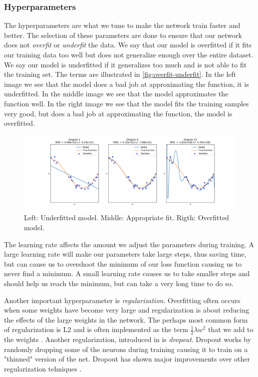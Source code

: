 \subsubsection*{Hyperparameters}
The hyperparameters are what we tune to make the network train faster and better. The selection of these parameters are done to ensure that our network does not \emph{overfit} or \emph{underfit} the data. We say that our model is overfitted if it fits our training data too well but does not generalize enough over the entire dataset. We say our model is underfitted if it generalizes too much and is not able to fit the training set. The terms are illustrated in \autoref{fig:overfit-underfit}. In the left image we see that the model does a bad job at approximating the function, it is underfitted. In the middle image we see that the model approximates the function well. In the right image we see that the model fits the training samples very good, but does a bad job at approximating the function, the model is overfitted.

\begin{figure}[H]
	\centering
	\includegraphics[width=\linewidth]{fig/overfit-underfit.png}
	\caption{Left: Underfitted model. Middle: Appropriate fit. Rigth: Overfitted model. }
	\label{fig:overfit-underfit}
\end{figure}
The learning rate affects the amount we adjust the parameters during training. A large learning rate will make our parameters take large steps, thus saving time, but can cause us to overshoot the minimum of our loss function causing us to never find a minimum. A small learning rate causes us to take smaller steps and should help us reach the minimum, but can take a very long time to do so.

Another important hyperparameter is \emph{regularization}. Overfitting often occurs when some weights have become very large and regularization is about reducing the effects of the large weights in the network. The perhaps most common form of regularization is L2 and is often implemented as the term $\frac{1}{2}\lambda w^2$ that we add to the weights \cite{Li}. Another regularization, introduced in \cite{Srivastava2014} is \emph{dropout}. Dropout works by randomly dropping some of the neurons during training causing it to train on a "thinned" version of the net. Dropout has shown  major improvements over other regularization tehniques \cite{Srivastava2014}.

